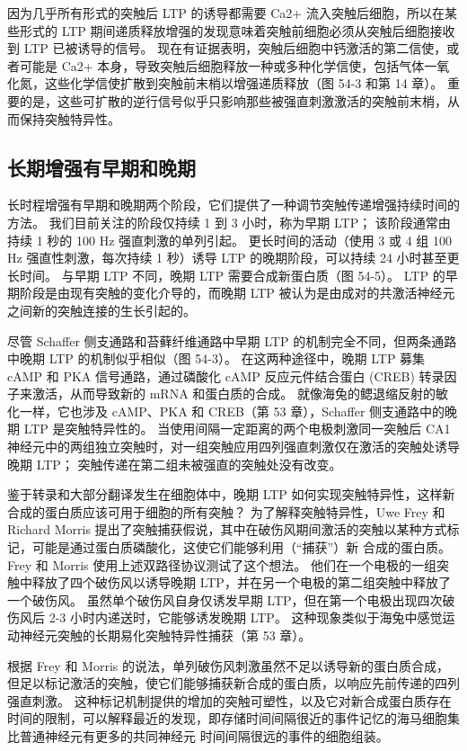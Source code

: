 因为几乎所有形式的突触后 LTP 的诱导都需要 Ca2+ 流入突触后细胞，所以在某些形式的 LTP 期间递质释放增强的发现意味着突触前细胞必须从突触后细胞接收到 LTP 已被诱导的信号。 现在有证据表明，突触后细胞中钙激活的第二信使，或者可能是 Ca2+ 本身，导致突触后细胞释放一种或多种化学信使，包括气体一氧化氮，这些化学信使扩散到突触前末梢以增强递质释放（图 54-3 和第 14 章）。 重要的是，这些可扩散的逆行信号似乎只影响那些被强直刺激激活的突触前末梢，从而保持突触特异性。

\subsection{长期增强有早期和晚期}
长时程增强有早期和晚期两个阶段，它们提供了一种调节突触传递增强持续时间的方法。 我们目前关注的阶段仅持续 1 到 3 小时，称为早期 LTP； 该阶段通常由持续 1 秒的 100 Hz 强直刺激的单列引起。 更长时间的活动（使用 3 或 4 组 100 Hz 强直性刺激，每次持续 1 秒）诱导 LTP 的晚期阶段，可以持续 24 小时甚至更长时间。 与早期 LTP 不同，晚期 LTP 需要合成新蛋白质（图 54-5）。 LTP 的早期阶段是由现有突触的变化介导的，而晚期 LTP 被认为是由成对的共激活神经元之间新的突触连接的生长引起的。

尽管 Schaffer 侧支通路和苔藓纤维通路中早期 LTP 的机制完全不同，但两条通路中晚期 LTP 的机制似乎相似（图 54-3）。 在这两种途径中，晚期 LTP 募集 cAMP 和 PKA 信号通路，通过磷酸化 cAMP 反应元件结合蛋白 (CREB) 转录因子来激活，从而导致新的 mRNA 和蛋白质的合成。 就像海兔的鳃退缩反射的敏化一样，它也涉及 cAMP、PKA 和 CREB（第 53 章），Schaffer 侧支通路中的晚期 LTP 是突触特异性的。 当使用间隔一定距离的两个电极刺激同一突触后 CA1 神经元中的两组独立突触时，对一组突触应用四列强直刺激仅在激活的突触处诱导晚期 LTP； 突触传递在第二组未被强直的突触处没有改变。

鉴于转录和大部分翻译发生在细胞体中，晚期 LTP 如何实现突触特异性，这样新合成的蛋白质应该可用于细胞的所有突触？ 为了解释突触特异性，Uwe Frey 和 Richard Morris 提出了突触捕获假说，其中在破伤风期间激活的突触以某种方式标记，可能是通过蛋白质磷酸化，这使它们能够利用（“捕获”）新 合成的蛋白质。 Frey 和 Morris 使用上述双路径协议测试了这个想法。 他们在一个电极的一组突触中释放了四个破伤风以诱导晚期 LTP，并在另一个电极的第二组突触中释放了一个破伤风。 虽然单个破伤风自身仅诱发早期 LTP，但在第一个电极出现四次破伤风后 2-3 小时内递送时，它能够诱发晚期 LTP。 这种现象类似于海兔中感觉运动神经元突触的长期易化突触特异性捕获（第 53 章）。

根据 Frey 和 Morris 的说法，单列破伤风刺激虽然不足以诱导新的蛋白质合成，但足以标记激活的突触，使它们能够捕获新合成的蛋白质，以响应先前传递的四列 强直刺激。 这种标记机制提供的增加的突触可塑性，以及它对新合成蛋白质存在时间的限制，可以解释最近的发现，即存储时间间隔很近的事件记忆的海马细胞集比普通神经元有更多的共同神经元 时间间隔很远的事件的细胞组装。

